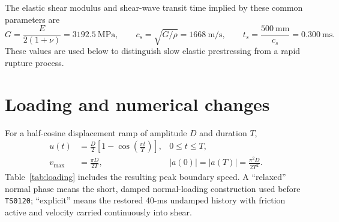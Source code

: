 \documentclass[11pt]{article}
\newcommand{\run}[1]{\texttt{TS#1}}
\begin{document}
The elastic shear modulus and shear-wave transit time implied by these common
parameters are
\begin{equation}
  G=\frac{E}{2(1+\nu)}=3192.5\ \mathrm{MPa},\qquad
  c_s=\sqrt{G/\rho}=1668\ \mathrm{m/s},\qquad
  t_s=\frac{500\ \mathrm{mm}}{c_s}=0.300\ \mathrm{ms}.
  \label{eq:transit}
\end{equation}
These values are used below to distinguish slow elastic prestressing from a
rapid rupture process.

\section{Loading and numerical changes}

For a half-cosine displacement ramp of amplitude $D$ and duration $T$,
\begin{align}
  u(t) &= \frac{D}{2}\left[1-\cos\left(\frac{\pi t}{T}\right)\right],
  &0\leq t\leq T, \\
  v_{\max} &= \frac{\pi D}{2T},
  &|a(0)|=|a(T)|=\frac{\pi^2D}{2T^2}.
  \label{eq:halfcosine}
\end{align}
Table~\ref{tab:loading} includes the resulting peak boundary speed.  A
``relaxed'' normal phase means the short, damped normal-loading construction
used before \run{0120}; ``explicit'' means the restored 40-ms undamped history
with friction active and velocity carried continuously into shear.
\end{document}
